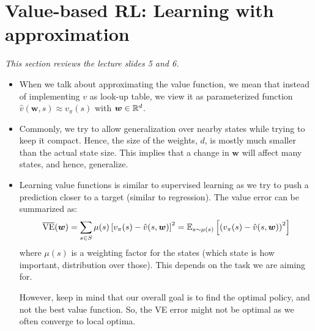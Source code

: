 \section{Value-based RL: Learning with approximation}
\label{sec:value_based_approximation}
\textit{This section reviews the lecture slides 5 and 6.}
\begin{itemize}
	\item When we talk about approximating the value function, we mean that instead of implementing $v$ as look-up table, we view it as parameterized function $\hat{v}(\bm{w},s)\approx v_{\pi}(s)$ with $\bm{w}\in\mathbb{R}^{d}$.
	\item Commonly, we try to allow generalization over nearby states while trying to keep it compact. Hence, the size of the weights,  $d$, is mostly much smaller than the actual state size. This implies that a change in $\bm{w}$ will affect many states, and hence, generalize.
	\item Learning value functions is similar to supervised learning as we try to push a prediction closer to a target (similar to regression). The value error can be summarized as:
	$$\overline{\text{VE}}(\bm{w}) = \sum_{s\in S}\mu(s)\left[v_{\pi}(s)-\hat{v}(s,\bm{w})\right]^2=\mathbb{E}_{s\sim\mu(s)}\left[\left(v_{\pi}(s)-\hat{v}(s,\bm{w})\right)^2\right]$$
	where $\mu(s)$ is a weighting factor for the states (which state is how important, distribution over those). This depends on the task we are aiming for.
	
	However, keep in mind that our overall goal is to find the optimal policy, and not the best value function. So, the VE error might not be optimal as we often converge to local optima. 
\end{itemize}
